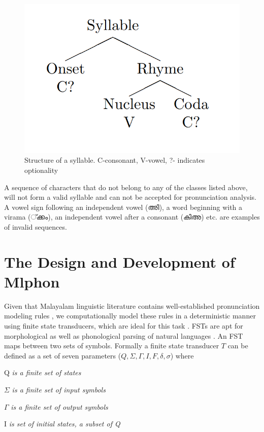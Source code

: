 \documentclass{ieeeaccess}
\begin{document}
\begin{figure}[h]
	\centering
	\includegraphics[width=0.6\linewidth]{syllable}
	\caption{Structure of a syllable. C-consonant, V-vowel, ?- indicates optionality}
	\label{syllable}
\end{figure}


A sequence of characters that do not belong to any of the classes listed above, will not form a valid syllable and can not be accepted for pronunciation analysis. A vowel sign following an independent vowel ({\mal അി}), a word beginning with a virama ({\mal ്ക്കം}), an independent vowel after a consonant ({\mal കിഅ}) etc. are  examples of invalid sequences.




\section{The Design and Development of Mlphon}
\label{arch}

Given that Malayalam linguistic literature contains well-established pronunciation modeling rules \cite{mohanan1989syllable, asher1997, prabo2016}, we computationally model these rules in a deterministic manner using finite state transducers, which are ideal for this task \cite{kaplan1994regular}. FSTs are apt for morphological as well as phonological parsing of natural languages \cite{kaplan1994regular}. An FST maps between two sets of symbols. Formally a finite state transducer $T$ can be defined \cite{jurafsky2014speech} as a set of seven parameters ($Q,\Sigma, \Gamma, I, F, \delta, \sigma$) where

Q \textit{is a finite set of states}

$\Sigma$  \textit{is a finite set of input symbols}

$\Gamma$ \textit{is a finite set of output symbols}

I \textit{is set of initial states,  a subset of Q}
\end{document}
